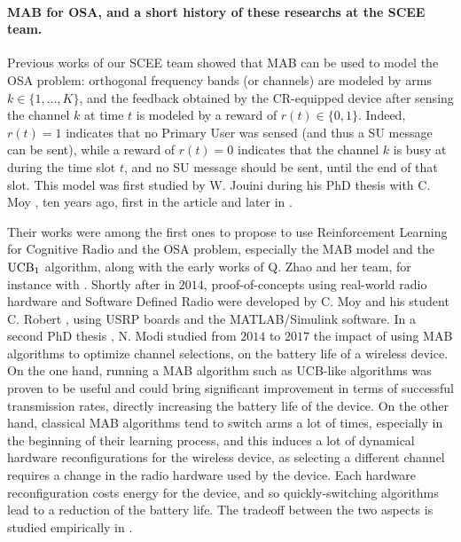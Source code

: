 \paragraph{MAB for OSA, and a short history of these researchs at the SCEE team.}
%
Previous works of our SCEE team showed that MAB can be used to model the OSA problem:
orthogonal frequency bands (or channels) are modeled by arms $k\in\{1,\dots,K\}$,
and the feedback obtained by the CR-equipped device after sensing the channel $k$ at time $t$ is modeled by a reward of $r(t) \in \{0,1\}$.
Indeed, $r(t) = 1$ indicates that no Primary User was sensed (and thus a SU message can be sent), while a reward of $r(t)=0$ indicates that the channel $k$ is busy at during the time slot $t$, and no SU message should be sent, until the end of that slot.
%
This model was first studied by W. Jouini during his PhD thesis with C. Moy \cite{Jouini12PhD}, ten years ago, first in the article \cite{Jouini09} and later in \cite{Jouini10,Jouini12}.

Their works were among the first ones to propose to use Reinforcement Learning for Cognitive Radio and the OSA problem, especially the MAB model and the $\mathrm{UCB}_1$ algorithm,
along with the early works of Q. Zhao and her team, for instance with \cite{Liu08,Zhao10}.
%
Shortly after in $2014$, proof-of-concepts using real-world radio hardware and Software Defined Radio were developed by C. Moy and his student C. Robert \cite{RobertSDR2014,MoyWSR2014}, using USRP boards and the MATLAB/Simulink software.
In a second PhD thesis \cite{Modi17PhD}, N. Modi studied from $2014$ to $2017$ the impact of using MAB algorithms to optimize channel selections, on the battery life of a wireless device.
On the one hand, running a MAB algorithm such as UCB-like algorithms was proven to be useful and could bring significant improvement in terms of successful transmission rates, directly increasing the battery life of the device.
On the other hand, classical MAB algorithms tend to switch arms a lot of times, especially in the beginning of their learning process, and this induces a lot of dynamical hardware reconfigurations for the wireless device, as selecting a different channel requires a change in the radio hardware used by the device.
Each hardware reconfiguration costs energy for the device, and so quickly-switching algorithms lead to a reduction of the battery life.
The tradeoff between the two aspects is studied empirically in
\cite{modiDemo2016}.

